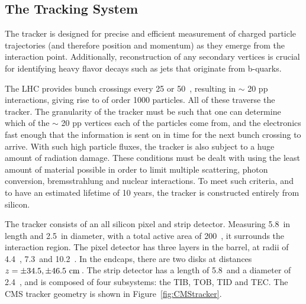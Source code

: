 
\subsection{The Tracking System}
The tracker is designed for precise and efficient measurement of charged particle trajectories (and therefore position and momentum) as they emerge from the interaction point.
Additionally, reconstruction of any secondary vertices is crucial for identifying heavy flavor decays such as jets that originate from b-quarks.

The \ac{LHC} provides bunch crossings every 25 or 50~\ns, resulting in $\sim$ 20 pp interactions, giving rise to of order 1000 particles. 
All of these traverse the tracker. 
The granularity of the tracker must be such that one can determine which of the $\sim$ 20 pp vertices each of the particles come from, 
and the electronics fast enough that the information is sent on in time for the next bunch crossing to arrive.
With such high particle fluxes, the tracker is also subject to a huge amount of radiation damage.
These conditions must be dealt with using the least amount of material possible in order to limit multiple scattering, photon conversion, bremsstrahlung and nuclear interactions.
To meet such criteria, and to have an estimated lifetime of 10 years, the tracker is constructed entirely from silicon.

The tracker consists of an all silicon pixel and strip detector.
Measuring 5.8~\m in length and 2.5~\m in diameter, with a total active area of 200~\msq, it surrounds the interaction region.
The pixel detector has three layers in the barrel, at radii of 4.4~\cm, 7.3~\cm and 10.2~\cm. In the endcaps, there are two disks at distances $z=\pm 34.5, \pm 46.5~\mathrm{cm}\,$.
The strip detector has a length of 5.8~\m and a diameter of 2.4~\m, and is composed of four subsystems: the \ac{TIB}, \ac{TOB}, \ac{TID} and \ac{TEC}. The \ac{CMS} tracker geometry is shown in Figure~\ref{fig:CMStracker}.

